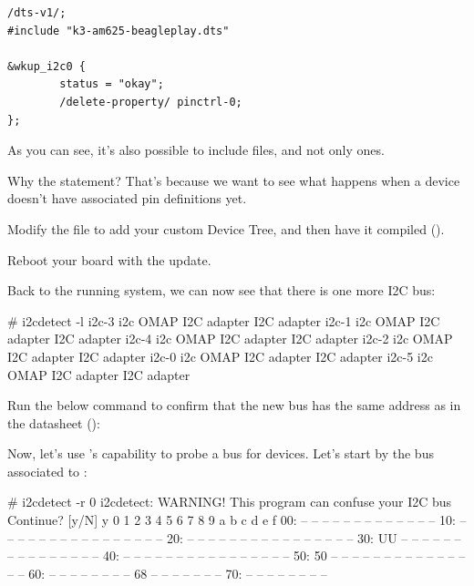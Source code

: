 \begin{verbatim}
/dts-v1/;
#include "k3-am625-beagleplay.dts"

&wkup_i2c0 {
        status = "okay";
        /delete-property/ pinctrl-0;
};
\end{verbatim}

As you can see, it's also possible to include  files, and not
only  ones.

Why the  statement? That's because we want to see what happens when a
device doesn't have associated pin definitions yet.

Modify the  file to add your custom
Device Tree, and then have it compiled ().

Reboot your board with the update.

Back to the running system, we can now see that there is one more
I2C bus:

\begin{bashinput}
# i2cdetect -l
i2c-3	i2c       	OMAP I2C adapter                	I2C adapter
i2c-1	i2c       	OMAP I2C adapter                	I2C adapter
i2c-4	i2c       	OMAP I2C adapter                	I2C adapter
i2c-2	i2c       	OMAP I2C adapter                	I2C adapter
i2c-0	i2c       	OMAP I2C adapter                	I2C adapter
i2c-5	i2c       	OMAP I2C adapter                	I2C adapter
\end{bashinput}

Run the below command to confirm that the new bus has the same address
as in the datasheet ():


Now, let's use 's capability to probe a bus for devices.
Let's start by the bus associated to :

\begin{bashinput}
# i2cdetect -r 0
i2cdetect: WARNING! This program can confuse your I2C bus
Continue? [y/N] y
     0  1  2  3  4  5  6  7  8  9  a  b  c  d  e  f
00:          -- -- -- -- -- -- -- -- -- -- -- -- --
10: -- -- -- -- -- -- -- -- -- -- -- -- -- -- -- --
20: -- -- -- -- -- -- -- -- -- -- -- -- -- -- -- --
30: UU -- -- -- -- -- -- -- -- -- -- -- -- -- -- --
40: -- -- -- -- -- -- -- -- -- -- -- -- -- -- -- --
50: 50 -- -- -- -- -- -- -- -- -- -- -- -- -- -- --
60: -- -- -- -- -- -- -- -- 68 -- -- -- -- -- -- --
70: -- -- -- -- -- -- -- --
\end{bashinput}

